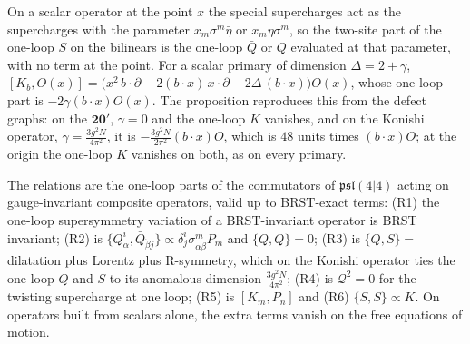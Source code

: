 \begin{remark}
On a scalar operator at the point $x$ the special supercharges act as the supercharges with the parameter $x_m\sigma^m\bar\eta$ or $x_m\eta\sigma^m$, so the two-site part of the one-loop $S$ on the bilinears is the one-loop $\bar Q$ or $Q$ evaluated at that parameter, with no term at the point. For a scalar primary of dimension $\Delta=2+\gamma$, $[K_b,O(x)]=\big(x^2\,b\cdot\partial-2(b\cdot x)\,x\cdot\partial-2\Delta\,(b\cdot x)\big)O(x)$, whose one-loop part is $-2\gamma(b\cdot x)O(x)$. The proposition reproduces this from the defect graphs: on the $\mathbf{20'}$, $\gamma=0$ and the one-loop $K$ vanishes, and on the Konishi operator, $\gamma=\frac{3g^2N}{4\pi^2}$, it is $-\frac{3g^2N}{2\pi^2}(b\cdot x)O$, which is $48$ units times $(b\cdot x)O$; at the origin the one-loop $K$ vanishes on both, as on every primary.
\end{remark}

\begin{remark}
The relations are the one-loop parts of the commutators of $\mathfrak{psl}(4|4)$ acting on gauge-invariant composite operators, valid up to BRST-exact terms: (R1) the one-loop supersymmetry variation of a BRST-invariant operator is BRST invariant; (R2) is $\{Q^i_\alpha,\bar Q_{\dot\beta j}\}\propto\delta^i_j\sigma^m_{\alpha\dot\beta}P_m$ and $\{Q,Q\}=0$; (R3) is $\{Q,S\}=$ dilatation plus Lorentz plus R-symmetry, which on the Konishi operator ties the one-loop $Q$ and $S$ to its anomalous dimension $\frac{3g^2N}{4\pi^2}$; (R4) is $\mathcal Q^2=0$ for the twisting supercharge at one loop; (R5) is $[K_m,P_n]$ and (R6) $\{S,\bar S\}\propto K$. On operators built from scalars alone, the extra terms vanish on the free equations of motion.
\end{remark}

